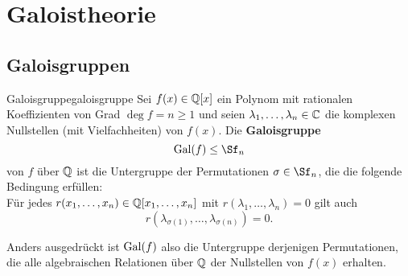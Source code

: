 \section{Galoistheorie}
\label{sec:galoistheorie}
\subsection{Galoisgruppen}
\label{subsec:galoisgruppen}
\begin{definition}{Galoisgruppe}{galoisgruppe}
Sei $f(x) \in \mathbb{Q}[x]$ ein Polynom mit rationalen Koeffizienten von Grad $\deg f = n \geq 1$ und seien $\lambda_1, \dots, \lambda_n \in \mathbb{C}$ die komplexen Nullstellen (mit Vielfachheiten) von $f(x)$. Die \textbf{Galoisgruppe}
\begin{equation}
\Gal(f) \leq \Sf_n
\end{equation} 
von $f$ über $\mathbb{Q}$ ist die Untergruppe der Permutationen $\sigma \in \Sf_n$, die die folgende Bedingung erfüllen:\\
Für jedes $r(x_1, \dots, x_n) \in \mathbb{Q}[x_1, \dots, x_n]$ mit $r(\lambda_1, \dots, \lambda_n) = 0$ gilt auch 
\begin{equation}
r(\lambda_{\sigma(1)}, \dots, \lambda_{\sigma(n)}) = 0.
\end{equation}
\end{definition}
Anders ausgedrückt ist $\operatorname{\text{Gal}} (f)$ also die Untergruppe derjenigen Permutationen, die alle algebraischen Relationen über $\mathbb{Q}$ der Nullstellen von $f(x)$ erhalten.
